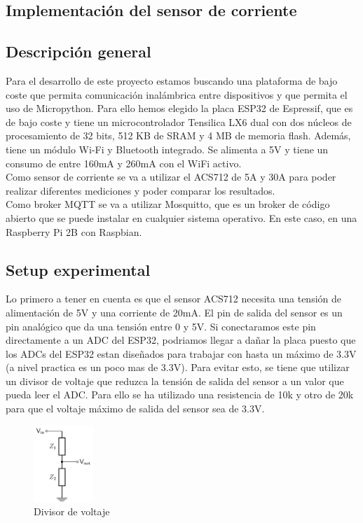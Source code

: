 \begin{titlepage}

\chapter{Implementación del sensor de corriente}
\section{Descripción general}
Para el desarrollo de este proyecto estamos buscando una plataforma de bajo coste que permita comunicación inalámbrica entre dispositivos y que permita el uso de Micropython. Para ello hemos elegido la placa ESP32 de Espressif, que es de bajo coste y tiene un microcontrolador Tensilica LX6 dual con dos núcleos de procesamiento de 32 bits, 512 KB de SRAM y 4 MB de memoria flash. Además, tiene un módulo Wi-Fi y Bluetooth integrado. Se alimenta a 5V y tiene un consumo\cite{ref16} de entre 160mA y 260mA con el WiFi activo. \\

Como sensor de corriente se va a utilizar el ACS712 de 5A y 30A para poder realizar diferentes mediciones y poder comparar los resultados. \\

Como broker MQTT se va a utilizar Mosquitto, que es un broker de código abierto que se puede instalar en cualquier sistema operativo. En este caso, en una Raspberry Pi 2B con Raspbian.\\


\section{Setup experimental}
Lo primero a tener en cuenta es que el sensor ACS712 necesita una tensión de alimentación de 5V y una corriente de 20mA. El pin de salida del sensor es un pin analógico que da una tensión entre 0 y 5V. Si conectaramos este pin directamente a un ADC del ESP32, podriamos llegar a dañar la placa puesto que los ADCs del ESP32 estan diseñados para trabajar con hasta un máximo de 3.3V (a nivel practica es un poco mas de 3.3V). Para evitar esto, se tiene que utilizar un divisor de voltaje que reduzca la tensión de salida del sensor a un valor que pueda leer el ADC. Para ello se ha utilizado una resistencia de 10k y otro de 20k para que el voltaje máximo de salida del sensor sea de 3.3V.\\

\begin{figure}[h!]
	\centering
	\includegraphics[width=0.20\textwidth]{imagenes/voltage_divider.png}
	\caption{Divisor de voltaje\cite{voltage_divider_img}}
\end{figure}


\end{titlepage}

